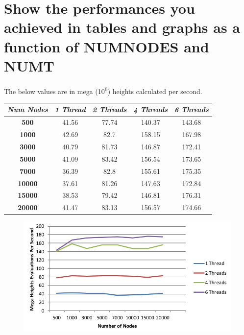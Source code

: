\documentclass[onecolumn,draftclsnofoot, 10pt, compsoc]{IEEEtran}
\begin{document}
	
	\section{Show the performances you achieved in tables and graphs as a function of NUMNODES and NUMT}
	
	The below values are in mega (10\textsuperscript{6}) heights calculated per second.
	
	\begin{center}
		\begin{tabular}{|c| |c| |c| |c| |c|} 
			\hline
			\textit{Num Nodes} & \textit{1 Thread} & \textit{2 Threads} & \textit{4 Threads} & \textit{6 Threads} \\
			\hline
			
			\textbf{500} &	41.56	& 77.74	& 140.37	& 143.68 \\
			\hline
			
			\textbf{1000}	& 42.69	& 82.7	& 158.15	& 167.98
 \\
			\hline
			
			\textbf{3000}	& 40.79& 	81.73	& 146.87	& 172.41
 \\
			\hline
			
			\textbf{5000}	& 41.09	& 83.42	& 156.54& 	173.65
 \\
			\hline
			
			\textbf{7000}	& 36.39	& 82.8	& 155.61	& 175.35
 \\
			\hline
			
			\textbf{10000}	& 37.61	& 81.26	& 147.63	& 172.84
 \\
			\hline
			
			\textbf{15000}	& 38.53& 	79.42	& 146.81& 	176.31
 \\
			\hline
			
			\textbf{20000}	& 41.47	& 83.13	& 156.57& 	174.66 \\
			\hline
		\end{tabular}
	\end{center}
	
	\begin{figure}[t]
		\includegraphics[width=18cm]{megasVnodes}
		\centering
	\end{figure}
\end{document}
